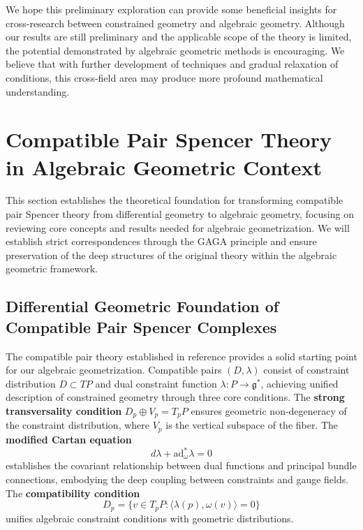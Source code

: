 \documentclass[a4paper,12pt]{extarticle}
\theoremstyle{definition}
\begin{document}
We hope this preliminary exploration can provide some beneficial insights for cross-research between constrained geometry and algebraic geometry. Although our results are still preliminary and the applicable scope of the theory is limited, the potential demonstrated by algebraic geometric methods is encouraging. We believe that with further development of techniques and gradual relaxation of conditions, this cross-field area may produce more profound mathematical understanding.

\section{Compatible Pair Spencer Theory in Algebraic Geometric Context}

This section establishes the theoretical foundation for transforming compatible pair Spencer theory from differential geometry to algebraic geometry, focusing on reviewing core concepts and results needed for algebraic geometrization. We will establish strict correspondences through the GAGA principle and ensure preservation of the deep structures of the original theory within the algebraic geometric framework.

\subsection{Differential Geometric Foundation of Compatible Pair Spencer Complexes}

The compatible pair theory established in reference\cite{zheng2025dynamical} provides a solid starting point for our algebraic geometrization. Compatible pairs $(D,\lambda)$ consist of constraint distribution $D \subset TP$ and dual constraint function $\lambda: P \to \mathfrak{g}^*$, achieving unified description of constrained geometry through three core conditions. The \textbf{strong transversality condition} $D_p \oplus V_p = T_pP$ ensures geometric non-degeneracy of the constraint distribution, where $V_p$ is the vertical subspace of the fiber. The \textbf{modified Cartan equation}
\begin{equation}\label{eq:cartan}
d\lambda + \mathrm{ad}^*_\omega \lambda = 0
\end{equation}
establishes the covariant relationship between dual functions and principal bundle connections, embodying the deep coupling between constraints and gauge fields. The \textbf{compatibility condition}
\begin{equation}\label{eq:compatibility}
D_p = \{v \in T_pP : \langle\lambda(p), \omega(v)\rangle = 0\}
\end{equation}
unifies algebraic constraint conditions with geometric distributions.
\end{document}
